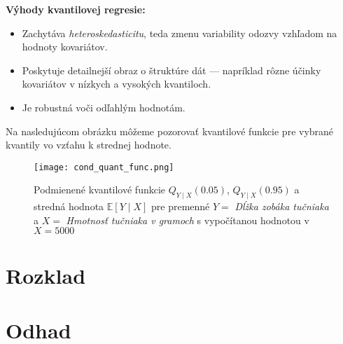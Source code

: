 \textbf{Výhody kvantilovej regresie:}
\begin{itemize}
  \item Zachytáva \textit{heteroskedasticitu}, teda zmenu variability odozvy vzhľadom na hodnoty kovariátov.
  \item Poskytuje detailnejší obraz o štruktúre dát — napríklad rôzne účinky kovariátov v nízkych a vysokých kvantiloch.
  \item Je robustná voči odľahlým hodnotám.
\end{itemize}

Na nasledujúcom obrázku môžeme pozorovať kvantilové funkcie pre vybrané kvantily vo vzťahu k strednej hodnote.

\begin{figure}[H]
    \centering
    \texttt{[image: cond\_quant\_func.png]}
    \caption{Podmienené kvantilové funkcie $Q_{Y \mid X}(0.05)$, $Q_{Y \mid X}(0.95)$ a stredná hodnota $\mathbb{E}[Y \mid X]$ pre premenné $Y=$ \textit{Dĺžka zobáka tučniaka} a $X=$ \textit{Hmotnosť tučniaka v gramoch} s vypočítanou hodnotou v $X=5000$}
    \label{fig:cond_quant_mean}
\end{figure}

\section{Rozklad}\label{sec:rozklad_kopule}
\section{Odhad}\label{sec:odhad}